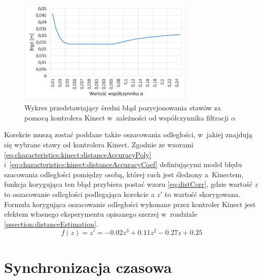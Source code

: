 \begin{figure}[!htb]
	\centering 
	\includegraphics[width=0.75\textwidth]{images/kinectPosErrorAlpha.png}
	\caption{Wykres przedstawiający średni błąd pozycjonowania stawów za pomocą kontrolera Kinect w~zależności od współczynnika filtracji $\alpha$}
	\label{fig:hybrid:kinect:lpf}
\end{figure}

Korekcie muszą zostać poddane także oszacowania odległości, w~jakiej znajdują się wybrane stawy od kontrolera Kinect. Zgodnie ze wzorami \ref{eq:characteristics:kinect:distanceAccuracyPoly} i~\ref{eq:characteristics:kinect:distanceAccuracyCoef} definiującymi model błędu szacowania odległości pomiędzy osobą, której ruch jest śledzony a~Kinectem, funkcja korygująca ten błąd przybiera postać wzoru \ref{eq:distCorr}, gdzie wartość $z$ to oszacowanie odległości podlegająca korekcie 
a $z'$ to wartość skorygowana. Formuła korygująca oszacowanie odległości wykonane przez kontroler Kinect jest efektem własnego eksperymentu opisanego szerzej w~rozdziale \ref{sssection:distanceEstimation}.
\begin{equation}
	f(z) = z' = -0.02z^3 + 0.11z^2 - 0.27z + 0.25
	\label{eq:distCorr}
\end{equation}
 

\section{Synchronizacja czasowa}

